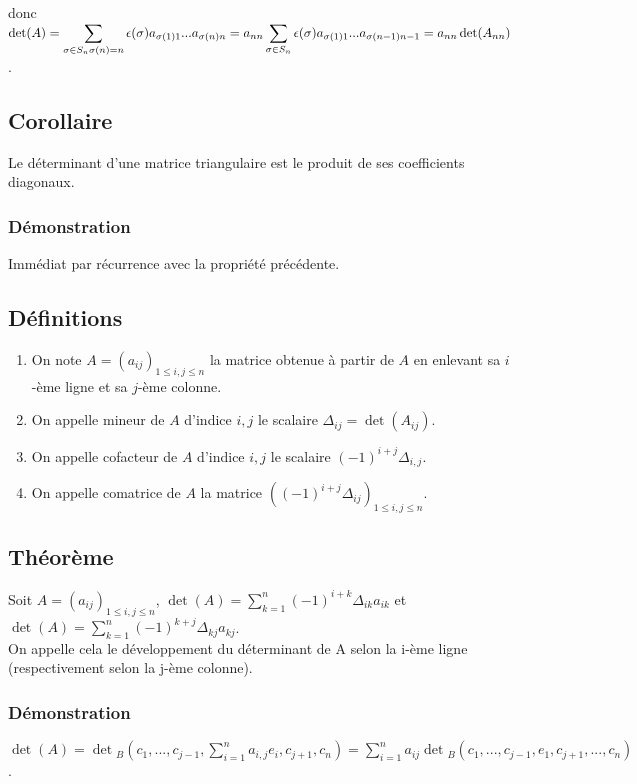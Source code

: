 \documentclass[a4paper,10pt]{book} %
\newcommand{\displayAmath}{\displaystyle}
\begin{document}
donc $\displayAmath\det(A)=\sum_{\sigma\in S_n\\ \sigma(n)=n}\epsilon(\sigma)a_{\sigma(1)1}...a_{\sigma(n)n}=a_{nn}\sum_{\sigma\in S_n}\epsilon(\sigma)a_{\sigma(1)1}...a_{\sigma(n-1)n-1}=a_{nn}\det(A_{nn})$.

\subsection{Corollaire}
Le déterminant d'une matrice triangulaire est le produit de ses coefficients diagonaux.

\subsubsection{Démonstration}
Immédiat par récurrence avec la propriété précédente.

\subsection{Définitions}
\begin{enumerate}
\item On note $A=(a_{ij})_{1\leq i,j\leq n}$ la matrice obtenue à partir de $A$ en enlevant sa $i$-ème ligne et sa $j$-ème colonne.
\item On appelle mineur de $A$ d'indice $i,j$ le scalaire $\Delta_{ij}=\det(A_{ij})$.
\item On appelle cofacteur de $A$ d'indice $i,j$ le scalaire $(-1)^{i+j}\Delta_{i,j}$.
\item On appelle comatrice de $A$ la matrice $((-1)^{i+j}\Delta_{ij})_{1\leq i,j\leq n}$.
\end{enumerate}

\subsection{Théorème}
Soit $\displayAmath A=(a_{ij})_{1\leq i,j\leq n}$, $\displayAmath\det(A)=\sum_{k=1}^n(-1)^{i+k}\Delta_{ik}a_{ik}$ et $\displayAmath\det(A)=\sum_{k=1}^n(-1)^{k+j}\Delta_{kj}a_{kj}$.\\

On appelle cela le développement du déterminant de A selon la i-ème ligne (respectivement selon la j-ème colonne).

\subsubsection{Démonstration}
$\displayAmath\det(A)=\det{}_B(c_1,...,c_{j-1},\sum_{i=1}^na_{i,j}e_i,c_{j+1},c_n)= \sum_{i=1}^na_{ij}\det{}_B(c_1,...,c_{j-1},e_1,c_{j+1},...,c_n)$.\\
\end{document}
